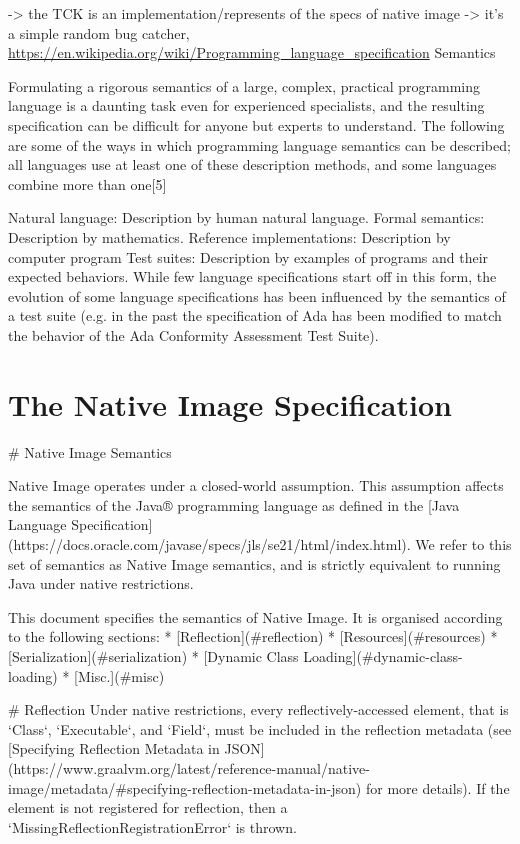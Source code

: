 -> the TCK is an implementation/represents of the specs of native image
-> it's a simple random bug catcher, 
\url{https://en.wikipedia.org/wiki/Programming_language_specification}
Semantics

Formulating a rigorous semantics of a large, complex, practical programming language is a daunting task even for experienced specialists, and the resulting specification can be difficult for anyone but experts to understand. The following are some of the ways in which programming language semantics can be described; all languages use at least one of these description methods, and some languages combine more than one[5]

    Natural language: Description by human natural language.
    Formal semantics: Description by mathematics.
    Reference implementations: Description by computer program
    Test suites: Description by examples of programs and their expected behaviors. While few language specifications start off in this form, the evolution of some language specifications has been influenced by the semantics of a test suite (e.g. in the past the specification of Ada has been modified to match the behavior of the Ada Conformity Assessment Test Suite).

\chapter{The Native Image Specification}\label{native_image_specs}
# Native Image Semantics

Native Image operates under a closed-world assumption. This assumption affects the semantics of the 
Java® programming language as defined in the 
[Java Language Specification](https://docs.oracle.com/javase/specs/jls/se21/html/index.html).
We refer to this set of semantics as Native Image semantics, and is strictly equivalent to running
Java under native restrictions.

This document specifies the semantics of Native Image.
It is organised according to the following sections:
* [Reflection](#reflection)
* [Resources](#resources)
* [Serialization](#serialization)
* [Dynamic Class Loading](#dynamic-class-loading)
* [Misc.](#misc)

# Reflection
Under native restrictions, every reflectively-accessed element, that is `Class`, `Executable`, and `Field`, must 
be included in the reflection metadata (see [Specifying Reflection Metadata in JSON](https://www.graalvm.org/latest/reference-manual/native-image/metadata/#specifying-reflection-metadata-in-json)
for more details). If the element is not registered for reflection, then a `MissingReflectionRegistrationError` is thrown.

